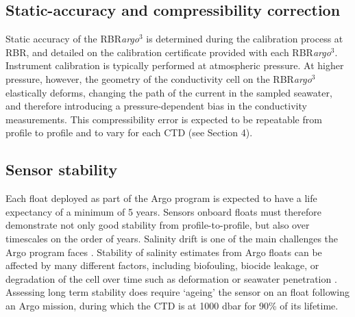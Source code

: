 \documentclass{ametsocV6.1}
\begin{document}
\subsection{Static-accuracy and compressibility correction}
Static accuracy of the RBR\textit{argo}$^3$ is determined during the calibration process at RBR, and detailed on the calibration certificate provided with each RBR\textit{argo}$^3$.
Instrument calibration is typically performed at atmospheric pressure. 
At higher pressure, however, the geometry of the conductivity cell on the RBR\textit{argo}$^3$ elastically deforms, changing the path of the current in the sampled seawater, and therefore introducing a pressure-dependent bias in the conductivity measurements.  This compressibility error is expected to be repeatable from profile to profile and to vary for each CTD (see Section 4). 

\subsection{Sensor stability}
Each float deployed as part of the Argo program is expected to have a life expectancy of a minimum of 5 years. 
Sensors onboard floats must therefore demonstrate not only good stability from profile-to-profile, but also over timescales on the order of years.
Salinity drift is one of the main challenges the Argo program faces \citep{Wong_2020}.  
Stability of salinity estimates from Argo floats can be affected by many different factors, including biofouling, biocide leakage, or degradation of the cell over time such as deformation or seawater penetration \citep{Wong_2003, Wong_2020}.  Assessing long term stability does require `ageing' the sensor on an float following an Argo mission, during which the CTD is at 1000 dbar for 90\% of its lifetime.
\end{document}

